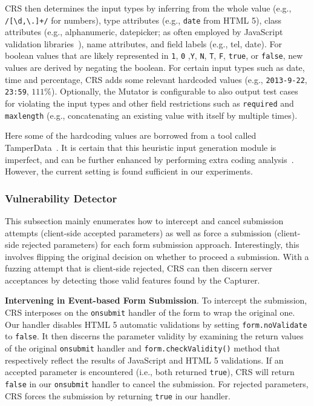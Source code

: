 \documentclass[letter]{sig-alternate-2013}
\begin{document}
CRS then determines the input types by inferring from the whole value (e.g., \verb"/[\d,\.]+/" for numbers), type attributes (e.g., \verb"date" from HTML 5), class attributes (e.g., alphanumeric, datepicker; as often employed by JavaScript validation libraries~\cite{jquery}), name attributes, and field labels (e.g., tel, date). For boolean values that are likely represented in \verb"1", \verb"0" ,\verb"Y", \verb"N", \verb"T", \verb"F", \verb"true", or \verb"false", new values are derived by negating the boolean. For certain input types such as date, time and percentage, CRS adds some relevant hardcoded values (e.g., \verb"2013-9-22", \verb"23:59", $111\%$). Optionally, the Mutator is configurable to also output test cases for violating the input types and other field restrictions such as \verb"required" and \verb"maxlength" (e.g., concatenating an existing value with itself by multiple times). 

Here some of the hardcoding values are borrowed from a tool called TamperData~\cite{tamperdata}. It is certain that this heuristic input generation module is imperfect, and can be further enhanced by performing extra coding analysis~\cite{notamper,waptec,viewpoints}. However, the current setting is found sufficient in our experiments.




\subsubsection{Vulnerability Detector}
\label{sec:crs_vul_detector}
This subsection mainly enumerates how to intercept and cancel submission attempts (client-side accepted parameters) as well as force a submission (client-side rejected parameters) for each form submission approach. Interestingly, this involves flipping the original decision on whether to proceed a submission. With a fuzzing attempt that is client-side rejected, CRS can then discern server acceptances by detecting those valid features found by the Capturer.

\textbf{Intervening in Event-based Form Submission}. To intercept the submission, CRS interposes on the \verb"onsubmit" handler of the form to wrap the original one.
Our handler disables HTML 5 automatic validations by setting \verb"form.noValidate" to \verb"false". It then discerns the parameter validity by examining the return values of the original \verb"onsubmit" handler and \verb"form.checkValidity()" method that respectively reflect the results of JavaScript and HTML 5 validations. If an accepted parameter is encountered (i.e., both returned \verb"true"), CRS will return \verb"false" in our \verb"onsubmit" handler to cancel the submission. For rejected parameters, CRS forces the submission by returning \verb"true" in our handler.
\end{document}
